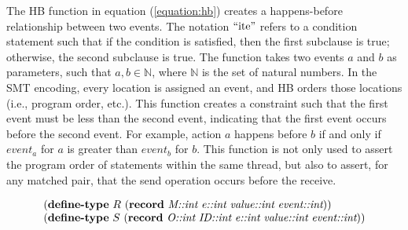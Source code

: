 The HB function in equation (\ref{equation:hb}) creates a happens-before relationship between two events. The notation $``\mathrm{ite}"$ refers to a condition statement such that if the condition is satisfied, then the first subclause is true; otherwise, the second subclause is true. The function takes two events $a$ and $b$ as parameters, such that $a,b \in \mathbb{N}$, where $\mathbb{N}$ is the set of natural numbers. In the SMT encoding, every location is assigned an event, and HB orders those locations (i.e., program order, etc.). This function creates a constraint such that the first event must be less than the second event, indicating that the first event occurs before the second event. For example, action $a$ happens before $b$ if and only if $\mathit{event}_a$ for $a$ is greater than $\mathit{event}_b$ for $b$. This function is not only used to assert the program order of statements within the same thread, but also to assert, for any matched pair, that the send operation
occurs before the receive.

\begin{equation}
\begin{array}{l}
(\textbf{define-type}\ R\ (\textbf{record}\ \emph{M::int}\ \emph{e::int}\ \emph{value::int}\ \emph{event::int})) \\
(\textbf{define-type}\ S\ (\textbf{record}\ \emph{O::int}\ \emph{ID::int}\ \emph{e::int}\ \emph{value::int}\ \emph{event::int}))
\end{array}
\label{equation:record}
\end{equation}

